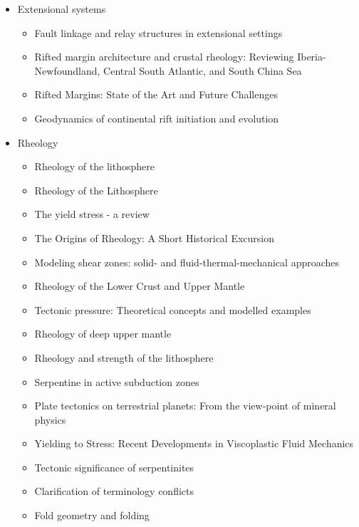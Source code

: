 \begin{itemize}
\item Extensional systems
   \begin{itemize}
   \item [\twothousandsixteen] Fault linkage and relay structures in extensional settings \cite{foro16}
   \item [\twothousandseventeen] Rifted margin architecture and crustal rheology: Reviewing 
                Iberia-Newfoundland, Central South Atlantic, and South China Sea \cite{brhc17}
   \item [\twothousandnineteen] Rifted Margins: State of the Art and Future Challenges \cite{pema19}
   \item [\twothousandtwentythree] Geodynamics of continental rift initiation and evolution \cite{brko23}
   \end{itemize}

\item Rheology 
   \begin{itemize}
   \item [\nineteeneightythree] Rheology of the lithosphere \cite{kirb83}
   \item [\nineteeneightyseven] Rheology of the Lithosphere \cite{kikr87} \cite{ramu87}
   \item [\nineteenninetynine] The yield stress - a review \cite{barn99}
   \item [\twothousandtwo] The Origins of Rheology: A Short Historical Excursion \cite{dora02}
   \item [\twothousandthree] Modeling shear zones: solid- and fluid-thermal-mechanical approaches \cite{reyu03}
   \item [\twothousandeight] Rheology of the Lower Crust and Upper Mantle \cite{budr08}
   \item [\twothousandeight] Tectonic pressure: Theoretical concepts and modelled examples \cite{manc08}
   \item [\twothousandten] Rheology of deep upper mantle \cite{kara10}
   \item [\twothousandeleven] Rheology and strength of the lithosphere \cite{buro11}
   \item [\twothousandtwelve] Serpentine in active subduction zones \cite{reyn12}
   \item [\twothousandfourteen] Plate tectonics on terrestrial planets: From the view-point of mineral physics \cite{kara14}
   \item [\twothousandfourteen] Yielding to Stress: Recent Developments in Viscoplastic Fluid Mechanics \cite{bafo14}
   \item [\twothousandfifteen] Tectonic significance of serpentinites \cite{gusr15}
   \item [\twothousandtwentyone] Clarification of terminology conflicts \cite{wang21} 
   \item [\twothousandtwentyone] Fold geometry and folding \cite{nafo21} 
   \end{itemize}


\end{itemize}
